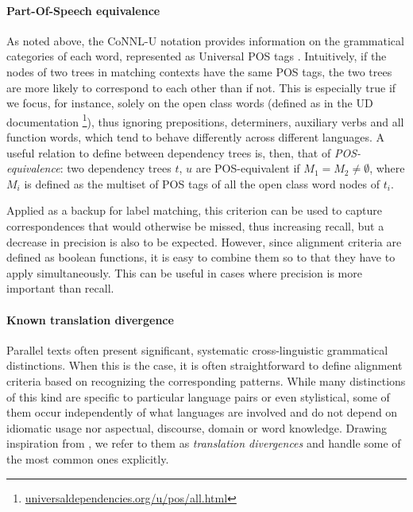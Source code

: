 \documentclass[11pt]{article}
\begin{document}
\paragraph{Part-Of-Speech equivalence}
As noted above, the CoNNL-U notation provides information on the grammatical categories of each word, represented as Universal POS tags \cite{petrov-etal-2012-universal}. 
Intuitively, if the nodes of two trees in matching contexts have the same POS tags, the two trees are more likely to correspond to each other than if not. 
This is especially true if we focus, for instance, solely on the open class words (defined as in the UD documentation \footnote{\url{universaldependencies.org/u/pos/all.html}}), thus ignoring prepositions, determiners, auxiliary verbs and all function words, which tend to behave differently across different languages.
A useful relation to define between dependency trees is, then, that of \textit{POS-equivalence}: two dependency trees $t$, $u$ are POS-equivalent if $M_1 = M_2 \neq \emptyset$, where $M_i$ is defined as the multiset of POS tags of all the open class word nodes of $t_i$. 

Applied as a backup for label matching, this criterion can be used to capture correspondences that would otherwise be missed, thus increasing recall, but a decrease in precision is also to be expected. 
However, since alignment criteria are defined as boolean functions, it is easy to combine them so to that they have to apply simultaneously. This can be useful in cases where precision is more important than recall.

\paragraph{Known translation divergence}
Parallel texts often present significant, systematic cross-linguistic grammatical distinctions. 
When this is the case, it is often straightforward to define alignment criteria based on recognizing the corresponding patterns.
While many distinctions of this kind are specific to particular language pairs or even stylistical, some of them occur independently of what languages are involved and do not depend on idiomatic usage nor aspectual, discourse, domain or word knowledge.   
Drawing inspiration from \cite{dorr-1994-machine}, we refer to them as \textit{translation divergences} and handle some of the most common ones explicitly. 
\end{document}
